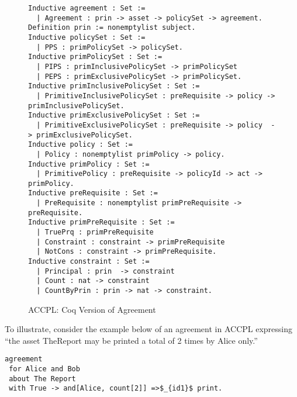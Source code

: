 \documentclass[conference]{IEEEtran}
\begin{document}
\lstset{language=Coq, captionpos=b}
\begin{figure*}
\begin{lstlisting}
Inductive agreement : Set :=
  | Agreement : prin -> asset -> policySet -> agreement.
Definition prin := nonemptylist subject.
Inductive policySet : Set :=
  | PPS : primPolicySet -> policySet.
Inductive primPolicySet : Set :=
  | PIPS : primInclusivePolicySet -> primPolicySet
  | PEPS : primExclusivePolicySet -> primPolicySet.
Inductive primInclusivePolicySet : Set :=
  | PrimitiveInclusivePolicySet : preRequisite -> policy -> primInclusivePolicySet.
Inductive primExclusivePolicySet : Set :=
  | PrimitiveExclusivePolicySet : preRequisite -> policy  -> primExclusivePolicySet.
Inductive policy : Set :=
  | Policy : nonemptylist primPolicy -> policy.
Inductive primPolicy : Set :=
  | PrimitivePolicy : preRequisite -> policyId -> act -> primPolicy.  
Inductive preRequisite : Set :=
  | PreRequisite : nonemptylist primPreRequisite -> preRequisite.
Inductive primPreRequisite : Set :=
  | TruePrq : primPreRequisite
  | Constraint : constraint -> primPreRequisite
  | NotCons : constraint -> primPreRequisite.
Inductive constraint : Set :=
  | Principal : prin  -> constraint 
  | Count : nat -> constraint 
  | CountByPrin : prin -> nat -> constraint.  
\end{lstlisting}
\caption{ACCPL: Coq Version of Agreement}
\label{fig:agreementcoq}
\end{figure*}

%

To illustrate, consider the example below of an
agreement in ACCPL expressing ``the asset TheReport may be printed a
total of 2 times by Alice only.''
%
\lstset{language=Pucella2006, captionpos=b}
\begin{lstlisting}
agreement
 for Alice and Bob
 about The Report
 with True -> and[Alice, count[2]] =>$_{id1}$ print.
\end{lstlisting}
%
\end{document}
